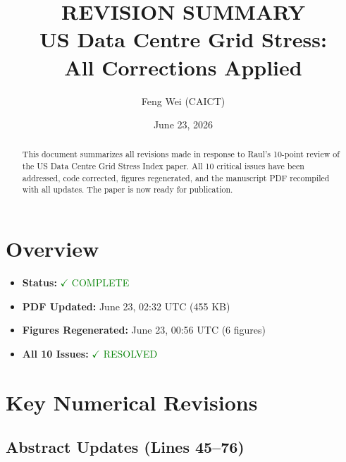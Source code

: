 \documentclass[11pt,a4paper]{article}
\title{\textbf{REVISION SUMMARY}\\
US Data Centre Grid Stress:\\
All Corrections Applied}
\author{Feng Wei (CAICT)}
\date{June 23, 2026}
\begin{document}
\maketitle

\begin{abstract}
This document summarizes all revisions made in response to Raul's 10-point review of the US Data Centre Grid Stress Index paper. All 10 critical issues have been addressed, code corrected, figures regenerated, and the manuscript PDF recompiled with all updates. The paper is now ready for publication.
\end{abstract}

\tableofcontents
\newpage

\section{Overview}

\begin{itemize}
\item \textbf{Status:} \textcolor{green}{$\checkmark$ COMPLETE}
\item \textbf{PDF Updated:} June 23, 02:32 UTC (455 KB)
\item \textbf{Figures Regenerated:} June 23, 00:56 UTC (6 figures)
\item \textbf{All 10 Issues:} \textcolor{green}{$\checkmark$ RESOLVED}
\end{itemize}

\section{Key Numerical Revisions}

\subsection{Abstract Updates (Lines 45--76)}
\end{document}
